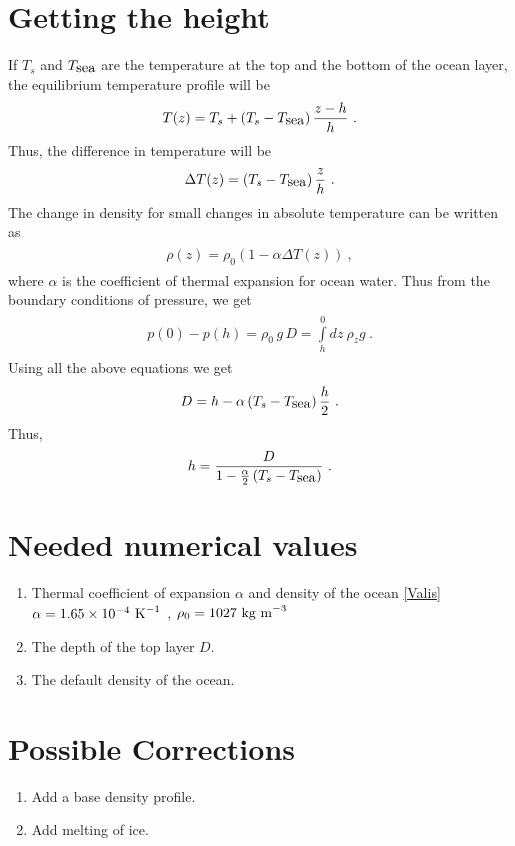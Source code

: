 \documentclass[fontsize = 13pt]{scrartcl}
\begin{document}
\section{Getting the height}
If \(T_s\) and \(T_{\mbox{sea}}\) are the temperature at the top and the bottom of the ocean layer, the equilibrium temperature profile will be
\begin{align}
\begin{split}
    T(z) = T_s + \left( T_s - T_{\mbox{sea}} \right)\frac{z -h}{h} \ .
\end{split}
\end{align}
Thus, the difference in temperature will be 
\begin{align}
\begin{split}
    \Delta T (z) = \left( T_s - T_{\mbox{sea}} \right)\frac{z}{h} \ .
\end{split}
\end{align}
The change in density for small changes in absolute temperature can be written as
\begin{align}
\begin{split}
    \rho(z) = \rho_0 \left( 1 -\alpha \Delta T(z) \right) \ ,
\end{split}
\end{align}
where \(\alpha\) is the coefficient of thermal expansion for ocean water. Thus from the boundary conditions of pressure, we get
\begin{align}
\begin{split}
    p(0) - p(h) =    \rho_0\,g\,D  = \int\limits_{h}^{0} dz\  \rho_z g  \ . 
\end{split}
\end{align}
Using all the above equations we get
\begin{align}
\begin{split}
    D = h - \alpha \left( T_s - T_{\mbox{sea}} \right)\frac{h}{2} \ .
\end{split}
\end{align}
Thus, 
\begin{align}
\begin{split}
    h = \frac{D}{1 - \frac{\alpha}{2} \left( T_s{} - T_{\mbox{sea}} \right)} \ .
\end{split}
\end{align}

\section{Needed numerical values}
\begin{enumerate}
    \item Thermal coefficient of expansion \(\alpha\) and density of the ocean
      \ref{Valis}\\
        \(\alpha = 1.65 \times 10^{-4}\mbox{ K}^{-1}\) , \(\rho_0 =  1027 \mbox{ kg m}^{-3}\)
    \item The depth of the top layer \(D\).
    \item The default density of the ocean.
\end{enumerate}
\section{Possible Corrections}
\begin{enumerate}
    \item Add a base density profile.
    \item Add melting of ice.
\end{enumerate}
\end{document}
